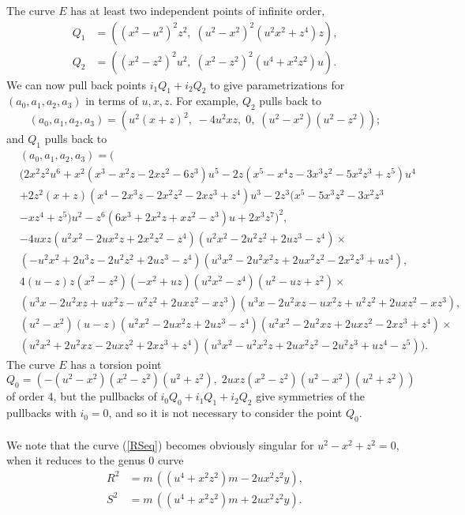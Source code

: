 \documentclass[10pt]{amsart}
\theoremstyle{plain}
\begin{document}
The curve $E$ has at least two independent points of infinite order,
\begin{align*}
	Q_1 & = ((x^2-u^2)^2z^2, \; (u^2-x^2)^2(u^2x^2+z^4)z), \\
	Q_2 & = ((x^2-z^2)^2u^2, \; (x^2-z^2)^2(u^4+x^2z^2)u).
\end{align*}
We can now pull back points $i_1 Q_1+i_2 Q_2$ to give parametrizations for $(a_0
,a_1,a_2,a_3)$ in terms of $u,x,z$. For example, $Q_2$ pulls back to
\[ (a_0,a_1,a_2,a_3) = (u^2(x+z)^2, \; -4u^2x z, \; 0, \; (u^2-x^2)(u^2-z^2)); \]
and $Q_1$ pulls back to
\begin{align*}
	&	(a_0,a_1,a_2,a_3) = ( \\
	& 	(2 x^2 z^2 u^6 + x^2(x^3-x^2z-2x z^2-6z^3) u^5 -2 z(x^5-x^4z-3x^
3z^2-5x^2z^3+z^5) u^4 \\
	& + 2 z^2(x+z)(x^4-2x^3z-2x^2z^2-2x z^3+z^4) u^3 - 2z^3(x^5-5x^3z^2-3x^2
z^3 \\
& -x z^4+z^5) u^2 - z^6(6x^3+2x^2z+x z^2-z^3) u + 2x^3z^7)^2, \\
	&  -4u x z(u^2 x^2 - 2u x^2 z + 2x^2 z^2 - z^4)(u^2 x^2 - 2u^2 z^2 + 2u 
z^3 - z^4) \times \\
	& (-u^2 x^2 + 2u^3 z - 2u^2 z^2 + 2u z^3 - z^4)(u^3 x^2 - 2u^2 x^2 z + 2
u x^2 z^2 - 2x^2 z^3 + u z^4), \\
	&  4(u - z)z(x^2 - z^2)(-x^2 + u z)(u^2 x^2 - z^4) (u^2 - u z + z^2) \times \\
	& (u^3 x - 2u^2 x z + u x^2 z - u^2 z^2 + 2u x z^2 - x z^3)(u^3 x - 2u^2
 x z - u x^2 z + u^2 z^2 + 2u x z^2 - x z^3), \\
	&  (u^2 - x^2)(u - z)(u^2 x^2 - 2u x^2 z + 2u z^3 - z^4)(u^2 x^2 - 2u^2 
x z + 2u x z^2 - 2x z^3 + z^4) \times \\
	& (u^2 x^2 + 2u^2 x z - 2u x z^2 + 2x z^3 + z^4)(u^3 x^2 - u^2 x^2 z + 2
u x^2 z^2 - 2u^2 z^3 + u z^4 - z^5)).
\end{align*}
The curve $E$ has a torsion point 
\[ Q_0 = ( -(u^2-x^2)(x^2-z^2)(u^2+z^2), \; 2u x z(x^2-z^2)(u^2-x^2)(u^2+z^2)) \]
of order 4, but the pullbacks of $i_0 Q_0+i_1 Q_1+i_2 Q_2$ give symmetries of the pullbacks with $i_0=0$, and so it is not necessary to consider the point $Q_0$.\\ \\
\noindent
We note that the curve (\ref{RSeq}) becomes obviously singular for $u^2-x^2+z^2=
0$, when it reduces to the genus 0 curve 
\begin{equation}\label{RSeq2}
\begin{aligned}
    R^2 & = m \, ((u^4 + x^2z^2)m - 2u x^2z^2 y), \\
	S^2 & = m \, ((u^4 + x^2z^2)m + 2u x^2z^2 y).
\end{aligned}
\end{equation}
\end{document}
